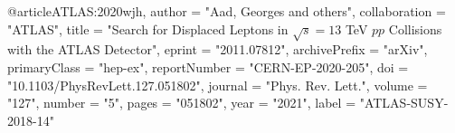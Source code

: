 @article{ATLAS:2020wjh,
    author = "Aad, Georges and others",
    collaboration = "ATLAS",
    title = "{Search for Displaced Leptons in $\sqrt{s} = 13$ TeV $pp$ Collisions with the ATLAS Detector}",
    eprint = "2011.07812",
    archivePrefix = "arXiv",
    primaryClass = "hep-ex",
    reportNumber = "CERN-EP-2020-205",
    doi = "10.1103/PhysRevLett.127.051802",
    journal = "Phys. Rev. Lett.",
    volume = "127",
    number = "5",
    pages = "051802",
    year = "2021",
    label = "ATLAS-SUSY-2018-14"
}

